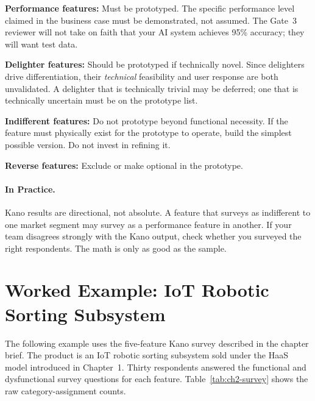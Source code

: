 \textbf{Performance features:}
Must be prototyped.
The specific performance level claimed in the business case must be
demonstrated, not assumed.
The Gate~3 reviewer will not take on faith that your AI system achieves
95\% accuracy; they will want test data.

\textbf{Delighter features:}
Should be prototyped if technically novel.
Since delighters drive differentiation, their \emph{technical} feasibility
and user response are both unvalidated.
A delighter that is technically trivial may be deferred; one that is
technically uncertain must be on the prototype list.

\textbf{Indifferent features:}
Do not prototype beyond functional necessity.
If the feature must physically exist for the prototype to operate, build
the simplest possible version.
Do not invest in refining it.

\textbf{Reverse features:}
Exclude or make optional in the prototype.

\paragraph{In Practice.}
Kano results are directional, not absolute.
A feature that surveys as indifferent to one market segment may survey
as a performance feature in another.
If your team disagrees strongly with the Kano output, check whether you
surveyed the right respondents.
The math is only as good as the sample.

\section{Worked Example: IoT Robotic Sorting Subsystem}
\label{sec:ch2-worked-example}

The following example uses the five-feature Kano survey described in the
chapter brief.
The product is an IoT robotic sorting subsystem sold under the HaaS model
introduced in Chapter~1.
Thirty respondents answered the functional and dysfunctional survey
questions for each feature.
Table~\ref{tab:ch2-survey} shows the raw category-assignment counts.

